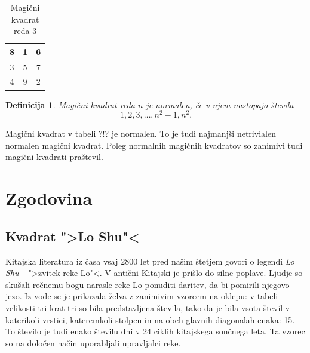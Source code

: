 \documentclass[a4paper,12pt]{article}
\newtheorem{definicija}{Definicija}}
\begin{document}


   
   \begin{table}
      \caption{Magični kvadrat reda 3}
      \centering  
      \large
      
     \label{table:mag3}    
     \begin{tabular}{|c|c|c|}
       \hline 
       8 & 1 & 6 \\\hline
       3 & 5 & 7 \\\hline
       4 & 9 & 2 \\\hline
         \end{tabular}
         \normalsize
   \end{table}



\begin{definicija}
   Magični kvadrat reda $n$ je \emph{normalen}, če v njem nastopajo števila
   \begin{equation}
      \label{eq:numbers}
      1, 2, 3, \ldots, n^2-1, n^2.
   \end{equation}
\end{definicija}

Magični kvadrat v tabeli ?!? je normalen.
To je tudi najmanjši netrivialen normalen magični kvadrat.
Poleg normalnih magičnih kvadratov so zanimivi tudi magični kvadrati praštevil.


\section{Zgodovina}

\subsection{Kvadrat ">Lo Shu"<}

Kitajska literatura iz časa vsaj 2800 let pred našim štetjem govori o legendi
\emph{Lo Shu} -- ">zvitek reke Lo"<. V antični Kitajski je prišlo do
silne poplave. Ljudje so skušali rečnemu bogu narasle reke Lo ponuditi daritev,
da bi pomirili njegovo jezo. Iz vode se je prikazala želva z zanimivim vzorcem
na oklepu: v tabeli velikosti tri krat tri so bila predstavljena števila, tako
da je bila vsota števil v katerikoli vrstici, kateremkoli stolpcu in na obeh
glavnih diagonalah enaka: 15. To število je tudi enako številu dni v 24 ciklih
kitajskega sončnega leta. Ta vzorec so na določen način uporabljali upravljalci
reke.
\end{document}
